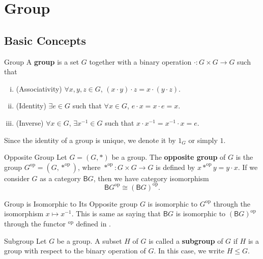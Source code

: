 
\chapter{Group}
\section{Basic Concepts}
\begin{definition}{Group}{}
    A \textbf{group} is a set $G$ together with a binary operation $\cdot:G\times G\to G$ such that
    \begin{enumerate}[(i)]
        \item (Associativity) $\forall x,y,z\in G$, $(x\cdot y)\cdot z=x\cdot(y\cdot z)$.
        \item (Identity) $\exists e\in G$ such that $\forall x\in G$, $e\cdot x=x\cdot e=x$.
        \item (Inverse) $\forall x\in G$, $\exists x^{-1}\in G$ such that $x\cdot x^{-1}=x^{-1}\cdot x=e$.
    \end{enumerate}
\end{definition}

Since the identity of a group is unique, we denote it by $1_G$ or simply $1$.
\begin{definition}{Opposite Group}{}
    Let $G=(G,*)$ be a group. The \textbf{opposite group} of $G$ is the group $G^{\mathrm{op}}=(G,*^{\mathrm{op}})$, where $*^{\mathrm{op}}:G\times G\to G$ is defined by $x*^{\mathrm{op}}y=y\cdot x$. If we consider $G$ as a category $\mathsf{B}G$, then we have category isomorphism
    \[
        \mathsf{B}G^{\mathrm{op}}\cong (\mathsf{B}G)^{\mathrm{op}}.
    \]
\end{definition}

\begin{proposition}{Group is Isomorphic to Its Opposite group}{}
    $G$ is isomorphic to $G^{\mathrm{op}}$ through the isomorphism $x\mapsto x^{-1}$. This is same as saying that $\mathsf{B}G$ is isomorphic to $(\mathsf{B}G)^{\mathrm{op}}$ through the functor ${}^{\mathrm{op}}$ defined in .
\end{proposition}


\begin{definition}{Subgroup}{}
    Let $G$ be a group. A subset $H$ of $G$ is called a \textbf{subgroup} of $G$ if $H$ is a group with respect to the binary operation of $G$. In this case, we write $H\le G$.
\end{definition}



